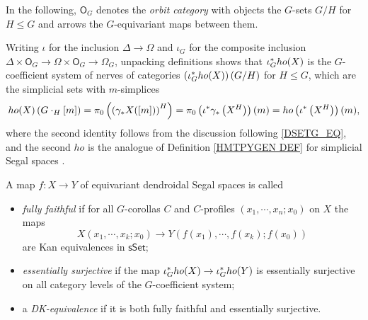 \documentclass[a4paper,10pt
 ,draft
]{article}%
\begin{document}
In the following, $\mathsf{O}_G$ denotes the \textit{orbit category} with objects the $G$-sets $G/H$ for $H \leq G$ and arrows the $G$-equivariant maps between them.

\begin{remark}
	Writing $\iota$ for the inclusion $\Delta \to \Omega$
	and $\iota_G$ for the composite inclusion
	$\Delta \times \mathsf{O}_G \to 
	\Omega \times \mathsf{O}_G \to
	\Omega_G$,
        unpacking definitions shows that $\iota_G^{\**}ho(X)$ is the $G$-coefficient system of nerves of categories $\left(\iota_G^{\**}ho(X)\right)(G/H)$ for $H \leq G$,
        which are the simplicial sets with $m$-simplices
	\begin{equation}\label{HOCOEFF EQ}
              ho(X)\left(G \cdot_H [m]\right) =
              \pi_0 \left( \left(\gamma_{\**}X([m])\right)^H\right) = 
              \pi_0 \left( \iota^{\**} \gamma_{\**}
              \left(X^H\right)\right)(m) = 
              ho\left(\iota^{\**}\left(X^H\right)\right)(m),
    \end{equation}
        where the second identity follows from
        the discussion following \eqref{DSETG_EQ},
        and the second $ho$ is the analogue of Definition \ref{HMTPYGEN DEF} for simplicial Segal spaces \cite[\S 5.5]{Rez01}.
\end{remark}

\begin{definition}\label{DKEQUIV DEF}
	A map $f \colon X \to Y$ of equivariant dendroidal Segal spaces is called 
\begin{itemize}
	\item \textit{fully faithful} if for all $G$-corollas $C$ and $C$-profiles $(x_1,\cdots,x_n;x_0)$ on $X$ the maps
\[
	X(x_1,\cdots,x_k;x_0) \to
	Y\left(f(x_1),\cdots,f(x_k);f(x_0)\right)
\]
are Kan equivalences in $\mathsf{sSet}$;
	\item \textit{essentially surjective} if
	the map $\iota_G^{\**}ho(X) \to \iota_G^{\**}ho(Y)$
	is essentially surjective on all category levels of the $G$-coefficient system;
	\item a \textit{DK-equivalence} if it is both fully faithful and essentially surjective.
\end{itemize}
\end{definition}
\end{document}
